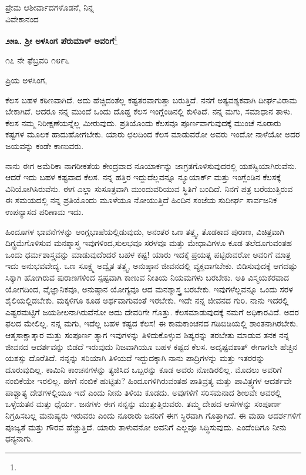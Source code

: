 {\flushright
ಪ್ರೇಮ ಆಶೀರ್ವಾದಗಳೊಡನೆ, ನಿನ್ನ\\ವಿವೇಕಾನಂದ\par}
\vspace{-0.3cm}

\begin{center}
\textbf{೨೫೩. ಶ‍್ರೀ ಅಳಸಿಂಗ ಪೆರುಮಾಳ್ ಅವರಿಗೆ}\footnote{}
\end{center}

\vspace{-0.7cm}

\begin{flushright}
೧೭ ನೇ ಫೆಬ್ರವರಿ ೧೮೯೬
\end{flushright}

\vspace{-0.35cm}

\noindent
ಪ್ರಿಯ ಅಳಸಿಂಗ,

ಕೆಲಸ ಬಹಳ ಕಠಿಣವಾಗಿದೆ. ಅದು ಹೆಚ್ಚಿದಂತೆಲ್ಲ ಕಷ್ಟತರವಾಗುತ್ತಾ ಬರುತ್ತಿದೆ. ನನಗೆ ಅತ್ಯವಶ್ಯಕವಾಗಿ ದೀರ್ಘವಿರಾಮ ಬೇಕಾಗಿದೆ. ಆದರೂ ನನ್ನ ಮುಂದೆ ಒಂದು ದೊಡ್ಡ ಕೆಲಸ ಇಂಗ್ಲೆಂಡಿನಲ್ಲಿ ಕುಳಿತಿದೆ. ನನ್ನ ಮಗು, ಸಮಾಧಾನ ತಾಳು. ಕೆಲಸ ನಮ್ಮ ನಿರೀಕ್ಷಣೆಯನ್ನೆಲ್ಲ ಮೀರುವುದು. ಪ್ರತಿಯೊಂದು ಕೆಲಸವೂ ಪೂರ್ಣವಾಗುವುದಕ್ಕೆ ಮುಂಚೆ ನೂರಾರು ಕಷ್ಟಗಳ ಮೂಲಕ ಹಾದುಹೋಗಬೇಕು. ಯಾರು ಛಲದಿಂದ ಕೆಲಸ ಮಾಡುವರೋ ಅವರು ಇಂದೋ ನಾಳೆಯೋ ಅದರ ಜಯವನ್ನು ಕಂಡೇ ಕಾಣುವರು.

ನಾನು ಈಗ ಅಮೆರಿಕಾ ನಾಗರೀಕತೆಯ ಕೇಂದ್ರವಾದ ನೂಯಾರ್ಕನ್ನು ಜಾಗ್ರತಗೊಳಿಸುವುದರಲ್ಲಿ ಯಶಸ್ವಿಯಾಗಿರುವೆನು. ಆದರೆ ಇದು ಬಹಳ ಕಷ್ಟವಾದ ಕೆಲಸ. ನನ್ನ ಹತ್ತಿರ ಇದ್ದುದೆಲ್ಲವನ್ನೂ ನ್ಯೂಯಾರ್ಕ್ ಮತ್ತು ಇಂಗ್ಲೆಂಡಿನ ಕೆಲಸಕ್ಕೆ ವಿನಿಯೋಗಿಸಿರುವೆನು. ಈಗ ಎಲ್ಲಾ ಸುಸೂತ್ರವಾಗಿ ಮುಂದುವರಿಯುವ ಸ್ಥಿತಿಗೆ ಬಂದಿದೆ. ನಿನಗೆ ಪತ್ರ ಬರೆಯುತ್ತಿರುವ ಈ ಸಮಯದಲ್ಲಿ ನನ್ನ ಪ್ರತಿಯೊಂದು ಮೂಳೆಯೂ ನೋಯುತ್ತಿದೆ\enginline{-} ಹಿಂದಿನ ಸಂಜೆಯ ಸುದೀರ್ಘ ಸಾರ್ವಜನಿಕ ಉಪನ್ಯಾಸದ ಪರಿಣಾಮ ಇದು.

ಹಿಂದೂಗಳ ಭಾವನೆಗಳನ್ನು ಆಂಗ್ಲಭಾಷೆಯಲ್ಲಿಡುವುದು, ಅನಂತರ ಒಣ ತತ್ತ್ವ, ತೊಡಕಾದ ಪುರಾಣ, ವಿಚಿತ್ರವಾಗಿ ದಿಗ್ಭ್ರಮೆಗೊಳಿಸುವ ಮನಶ್ಶಾಸ್ತ್ರ ಇವುಗಳಿಂದ,\break ಸುಲಭವೂ ಸರಳವೂ ಮತ್ತು ಮೇಧಾವಿಗಳೂ ಕೂಡ ತಲೆದೂಗುವಂತಹ ಒಂದು ಧರ್ಮಶಾಸ್ತ್ರವನ್ನು ಮಾಡುವುದೆಂದರೆ ಬಹಳ ಕಷ್ಟ! ಯಾರು ಇದಕ್ಕೆ ಪ್ರಯತ್ನ ಪಟ್ಟಿರುವರೋ ಅವರಿಗೆ ಮಾತ್ರ ಇದು ಅನುಭವವೇದ್ಯ. ಒಣ ಸೂಕ್ಷ್ಮ ಅದ್ವೈತ ತತ್ತ್ವ, ಅನುಷ್ಠಾನ ಜೀವನದಲ್ಲಿ ವ್ಯಕ್ತವಾಗಬೇಕು. ಬಿಡಿಸುವುದಕ್ಕೆ ಆಗದಷ್ಟು ಸಿಕ್ಕಾಗಿ ಹೋಗಿರುವ ಪುರಾಣಗಳಿಂದ ಸ್ಪಷ್ಟವಾಗಿ ಕಾಣುವ ನೀತಿಯ ನಿಯಮಗಳು ಬರಬೇಕು. ಅತಿ ವಿಸ್ಮಯಕರವಾದ ಯೋಗದಿಂದ, ವೈಜ್ಞಾನಿಕವೂ, ಅನುಷ್ಠಾನ ಯೋಗ್ಯವೂ ಆದ ಮನಶ್ಶಾಸ್ತ್ರ ಬರಬೇಕು. ಇವುಗಳೆಲ್ಲವನ್ನೂ ಒಂದು ಸರಳ ಶೈಲಿಯಲ್ಲಿಡಬೇಕು. ಮಕ್ಕಳಿಗೂ ಕೂಡ ಅರ್ಥವಾಗುವಂತೆ ಇರಬೇಕು. ಇದೇ ನನ್ನ ಜೀವನದ ಗುರಿ. ನಾನು ಇದರಲ್ಲಿ ಎಷ್ಟರಮಟ್ಟಿಗೆ ಜಯಶೀಲನಾಗಿರುವೆನೋ ಅದು ದೇವರಿಗೇ ಗೊತ್ತು. ಕೆಲಸಮಾಡುವುದಕ್ಕೆ ನಮಗೆ ಅಧಿಕಾರವಿದೆ. ಅದರ ಫಲದ ಮೇಲಿಲ್ಲ. ನನ್ನ ಮಗು, ಇದೆಲ್ಲ ಬಹಳ ಕಷ್ಟದ ಕೆಲಸ! ಈ ಕಾಮಕಾಂಚನದ ಗಡಿಬಿಡಿಯಲ್ಲಿ ಶಾಂತನಾಗಿರಬೇಕು. ಆತ್ಮಸಾಕ್ಷಾತ್ಕಾರ ಮತ್ತು ಸಂಪೂರ್ಣ ತ್ಯಾಗ ಇವುಗಳನ್ನು ತಿಳಿದುಕೊಳ್ಳುವ ಶಿಷ್ಯರನ್ನು ತರಬೇತು ಮಾಡುವ ತನಕ ನನ್ನ ಜೀವನದ ಆದರ್ಶವನ್ನು ಬಿಡದೆ ಇರುವುದು ನಿಜವಾಗಿಯೂ ಬಹಳ ಕಷ್ಟದ ಕೆಲಸ. ಅದೃಷ್ಟವಶಾತ್ ಈಗಾಗಲೇ ಹೆಚ್ಚಿನ ಯಶಸ್ಸು ದೊರೆತಿದೆ. ನನ್ನನ್ನು ಸರಿಯಾಗಿ ತಿಳಿಯದೆ ಇದ್ದುದಕ್ಕಾಗಿ ನಾನು ಪಾದ್ರಿಗಳನ್ನು ಮತ್ತು ಇತರರನ್ನು ದೂರುವುದಿಲ್ಲ. ಕಾಮಿನಿ ಕಾಂಚನಗಳನ್ನು ತ್ಯಜಿಸಿದ ಒಬ್ಬರನ್ನು ಕೂಡ ಅವರು ನೋಡಿರಲಿಲ್ಲ. ಮೊದಲು ಅವರಿಗೆ ನಂಬಿಕೆಯೇ ಇರಲಿಲ್ಲ. ಹೇಗೆ ನಂಬಿಕೆ ಹುಟ್ಟಿತು? ಹಿಂದೂಗಳಿಗಿರುವಂತಹ ಪಾತಿವ್ರತ್ಯ ಮತ್ತು ಪಾವಿತ್ರ್ಯಗಳ ಆದರ್ಶವೇ ಪಾಶ್ಚಾತ್ಯ ದೇಶಗಳಲ್ಲಿಯೂ ಇದೆ ಎಂದು ನೀನು ತಿಳಿಯ ಕೂಡದು. ಅವುಗಳಿಗೆ ಸರಿಸಮನಾದ ಶೀಲವೇ ಅವರಲ್ಲಿ ಒಳ್ಳೆಯತನ ಮತ್ತು ಧೈರ್ಯ. ಜನಗಳು ಈಗ ನನ್ನನ್ನು ಮುತ್ತುತ್ತಿರುವರು. ತಮ್ಮ ದೇಹದ ಆಸೆಗಳನ್ನು ಸಂಪೂರ್ಣ ನಿಗ್ರಹಿಸಬಲ್ಲ ಮನುಷ್ಯರು ಇರುವರು ಎಂದು ನೂರಾರು ಜನರಿಗೆ ಈಗ ಸ್ಥಿರವಾಗಿ ಗೊತ್ತಾಗಿದೆ. ಈ ಮಹಾ ಆದರ್ಶಗಳಿಗೆ ಪೂಜ್ಯತೆ ಮತ್ತು ಗೌರವ ಹೆಚ್ಚುತ್ತಿದೆ. ಯಾರು ತಾಳುವನೋ ಅವನಿಗೆ ಎಲ್ಲವೂ ಸಿದ್ಧಿಸುವುದು. ಎಂದೆಂದಿಗೂ ನೀನು ಧನ್ಯನಾಗು.

